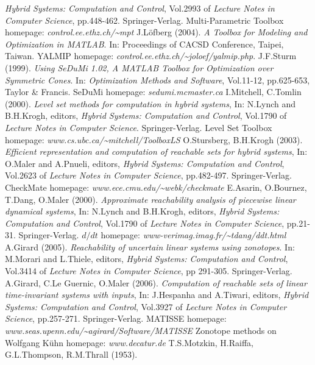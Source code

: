 \documentclass{report}
\begin{document}
\begin{thebibliography}{XX}
{\it Hybrid Systems: Computation and Control}, Vol.2993 of
{\it Lecture Notes in Computer Science}, pp.448-462. Springer-Verlag.
 Multi-Parametric Toolbox homepage:
{\it control.ee.ethz.ch/\~{ }mpt}
 J.L{\"o}fberg (2004).
{\it A Toolbox for Modeling and Optimization in MATLAB}. In: Proceedings
of CACSD Conference, Taipei, Taiwan.
 YALMIP homepage:
{\it control.ee.ethz.ch/\~{ }joloef/yalmip.php}.
 J.F.Sturm (1999). {\it Using SeDuMi 1.02, A MATLAB Toolbox
for Optimization over Symmetric Cones}. In: {\it Optimization Methods
and Software}, Vol.11-12, pp.625-653, Taylor \& Francis.
 SeDuMi homepage:
{\it sedumi.mcmaster.ca}
 I.Mitchell, C.Tomlin (2000). {\it Level set methods for
computation in hybrid systems}, In: N.Lynch and B.H.Krogh, editors,
{\it Hybrid Systems: Computation and Control}, Vol.1790 of
{\it Lecture Notes in Computer Science}. Springer-Verlag.
 Level Set Toolbox homepage:
{\it www.cs.ubc.ca/\~{ }mitchell/ToolboxLS}
 O.Stursberg, B.H.Krogh (2003). {\it Efficient representation
and computation of reachable sets for hybrid systems}, In: O.Maler and A.Pnueli,
editors, {\it Hybrid Systems: Computation and Control}, Vol.2623 of
{\it Lecture Notes in Computer Science}, pp.482-497. Springer-Verlag.
 CheckMate homepage:
{\it www.ece.cmu.edu/\~{ }webk/checkmate}
 E.Asarin, O.Bournez, T.Dang, O.Maler (2000). {\it Approximate
reachability analysis of piecewise linear dynamical systems},
In: N.Lynch and B.H.Krogh, editors,
{\it Hybrid Systems: Computation and Control}, Vol.1790 of
{\it Lecture Notes in Computer Science}, pp.21-31. Springer-Verlag.
 $d/dt$ homepage:
{\it www-verimag.imag.fr/\~{ }tdang/ddt.html}
 A.Girard (2005). {\it Reachability of uncertain linear
systems using zonotopes}. In: M.Morari and L.Thiele, editors,
{\it Hybrid Systems: Computation and Control}, Vol.3414 of
{\it Lecture Notes in Computer Science}, pp 291-305. Springer-Verlag.
 A.Girard, C.Le Guernic, O.Maler (2006).
{\it Computation of reachable sets of linear
time-invariant systems with inputs}, In: J.Hespanha and A.Tiwari, editors,
{\it Hybrid Systems: Computation and Control}, Vol.3927 of
{\it Lecture Notes in Computer Science}, pp.257-271. Springer-Verlag.
 MATISSE homepage:
{\it www.seas.upenn.edu/\~{ }agirard/Software/MATISSE}
 Zonotope methods on Wolfgang K\"{u}hn homepage:
{\it www.decatur.de}
 T.S.Motzkin, H.Raiffa, G.L.Thompson, R.M.Thrall (1953).

\end{thebibliography}
\end{document}
